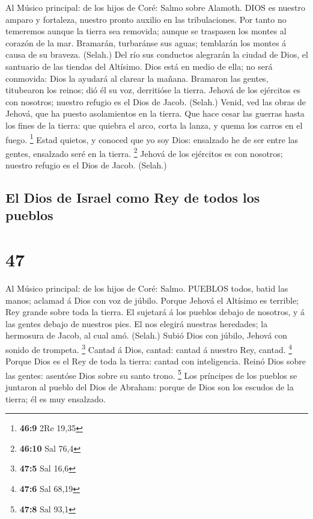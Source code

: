  Al Músico principal: de los hijos de Coré: Salmo sobre
Alamoth. DIOS es nuestro amparo y fortaleza, nuestro pronto auxilio en
las tribulaciones.  Por tanto no temeremos aunque la tierra
sea removida; aunque se traspasen los montes al corazón de la mar.
 Bramarán, turbaránse sus aguas; temblarán los montes á
causa de su braveza. (Selah.)  Del río sus conductos
alegrarán la ciudad de Dios, el santuario de las tiendas del Altísimo.
 Dios está en medio de ella; no será conmovida: Dios la
ayudará al clarear la mañana.  Bramaron las gentes,
titubearon los reinos; dió él su voz, derritióse la tierra. 
Jehová de los ejércitos es con nosotros; nuestro refugio es el Dios de
Jacob. (Selah.)  Venid, ved las obras de Jehová, que ha
puesto asolamientos en la tierra.  Que hace cesar las
guerras hasta los fines de la tierra: que quiebra el arco, corta la
lanza, y quema los carros en el fuego. \footnote{\textbf{46:9} 2Re 19,35}
 Estad quietos, y conoced que yo soy Dios: ensalzado he de
ser entre las gentes, ensalzado seré en la tierra. \footnote{\textbf{46:10}
  Sal 76,4}  Jehová de los ejércitos es con nosotros;
nuestro refugio es el Dios de Jacob. (Selah.)

\hypertarget{el-dios-de-israel-como-rey-de-todos-los-pueblos}{%
\subsection{El Dios de Israel como Rey de todos los
pueblos}\label{el-dios-de-israel-como-rey-de-todos-los-pueblos}}

\hypertarget{section-46}{%
\section{47}\label{section-46}}

 Al Músico principal: de los hijos de Coré: Salmo. PUEBLOS
todos, batid las manos; aclamad á Dios con voz de júbilo. 
Porque Jehová el Altísimo es terrible; Rey grande sobre toda la tierra.
 El sujetará á los pueblos debajo de nosotros, y á las
gentes debajo de nuestros pies.  El nos elegirá nuestras
heredades; la hermosura de Jacob, al cual amó. (Selah.) 
Subió Dios con júbilo, Jehová con sonido de trompeta. \footnote{\textbf{47:5}
  Sal 16,6}  Cantad á Dios, cantad: cantad á nuestro Rey,
cantad. \footnote{\textbf{47:6} Sal 68,19}  Porque Dios es
el Rey de toda la tierra: cantad con inteligencia.  Reinó
Dios sobre las gentes: asentóse Dios sobre su santo trono. \footnote{\textbf{47:8}
  Sal 93,1}  Los príncipes de los pueblos se juntaron al
pueblo del Dios de Abraham: porque de Dios son los escudos de la tierra;
él es muy ensalzado.

